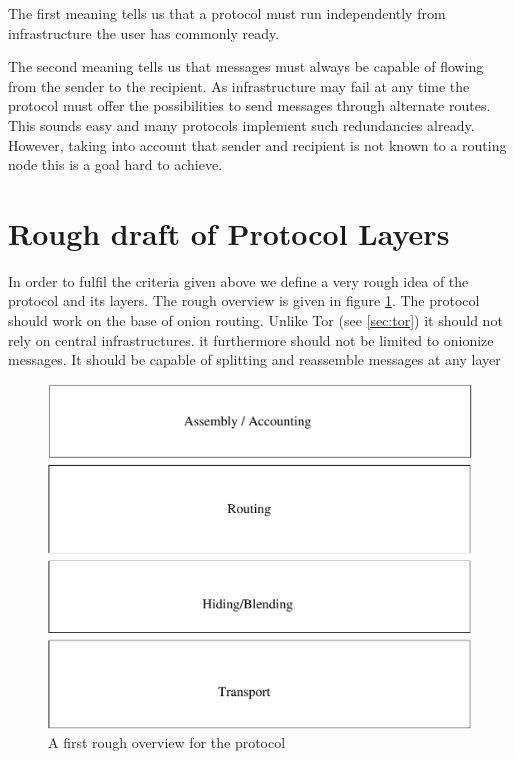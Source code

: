 The first meaning tells us that a protocol must run independently from infrastructure the user has commonly ready.

The second meaning tells us that messages must always be capable of flowing from the sender to the recipient. As infrastructure may fail at any time the protocol must offer the possibilities to send messages through alternate routes. This sounds easy and many protocols implement such redundancies already. However, taking into account that sender and recipient is not known to a routing node this is a goal hard to achieve.

\section{Rough draft of Protocol Layers}
In order to fulfil the criteria given above we define a very rough idea of the protocol and its layers. The rough overview is given in figure \ref{fig:roughProtocolDesign}. The protocol should work on the base of onion routing. Unlike Tor (see \ref{sec:tor}) it should not rely on central infrastructures. it furthermore should not be limited to onionize messages. It should be capable of splitting and reassemble messages at any layer 

\begin{figure}[h]
	\includegraphics[width=\columnwidth]{inc/roughProtocolDesign.pdf}
	\caption{A first rough overview for the protocol}
	\label{fig:roughProtocolDesign}
\end{figure}	

